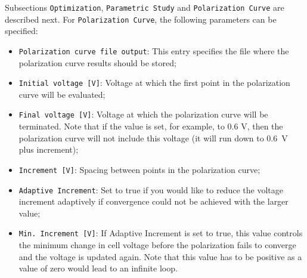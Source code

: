 Subsections \texttt{Optimization}, \texttt{Parametric Study} and \texttt{Polarization Curve} are described next. For \texttt{Polarization Curve}, the following parameters can be specified:
\begin{itemize}
  \item \texttt{Polarization curve file output}: This entry specifies the file where the polarization curve results should be stored;
  \item \texttt{Initial voltage [V]}: Voltage at which the first point in the polarization curve will be evaluated;
  \item \texttt{Final voltage [V]}: Voltage at which the polarization curve will be terminated. Note that if the value is set, for example, to 0.6 V, then the polarization curve will not include this voltage (it will run down to 0.6~V plus increment);
  \item \texttt{Increment [V]}: Spacing between points in the polarization curve;
  \item \texttt{Adaptive Increment}: Set to true if you would like to reduce the voltage increment adaptively if convergence could not be achieved with the larger value;
  \item \texttt{Min. Increment [V]}: If Adaptive Increment is set to true, this value controls the minimum change in cell voltage before the polarization fails to converge and the voltage is updated again. Note that this value has to be positive as a value of zero would lead to an infinite loop.
\end{itemize}

